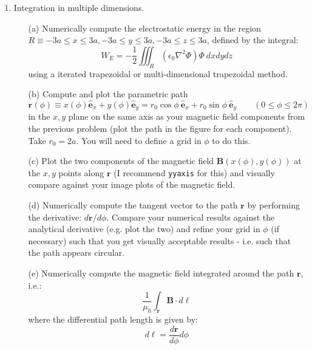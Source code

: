 \documentclass{article}
\begin{document}
\begin{enumerate}
\begin{itemize}
    
  \end{itemize}
  \item  Integration in multiple dimensions.  
  \begin{itemize}
    \item[(a)] Numerically compute the electrostatic energy in the region $R \equiv -3a \le x \le 3a, -3a \le y \le 3a, -3a \le z \le 3a$, defined by the integral:  
    \begin{equation}
      W_E = - \frac{1}{2} \iiint_R \left( \epsilon_0 \nabla^2 \Phi \right) \Phi ~dx dy dz
    \end{equation}
    using a iterated trapezoidal or multi-dimensional trapezoidal method.  
    \item[(b)]  Compute and plot the parametric path
    \begin{equation}
       \mathbf{r}(\phi) \equiv x(\phi)\hat{\mathbf{e}}_x + y(\phi)\hat{\mathbf{e}}_y = r_0 \cos \phi ~ \hat{\mathbf{e}}_x + r_0 \sin \phi ~ \hat{\mathbf{e}}_y \qquad (0 \le \phi \le 2 \pi)
    \end{equation}    
    in the $x,y$ plane on the same axis as your magnetic field components from the previous problem (plot the path in the figure for each component).  Take $r_0 = 2a$.  You will need to define a grid in $\phi$ to do this.
    \item[(c)]  Plot the two components of the magnetic field $\mathbf{B}(x(\phi),y(\phi))$ at the $x,y$ points along $\mathbf{r}$ (I recommend \texttt{yyaxis} for this) and visually compare against your image plots of the magnetic field.  
    \item[(d)]  Numerically compute the tangent vector to the path $\mathbf{r}$ by performing the derivative:  $d \mathbf{r} / d \phi$.  Compare your numerical results against the analytical derivative (e.g. plot the two) and refine your grid in $\phi$ (if necessary) such that you get visually acceptable results - i.e. such that the path appears circular.  
    \item[(e)]  Numerically compute the magnetic field integrated around the path $\mathbf{r}$, i.e.:
    \begin{equation}
       \frac{1}{\mu_0} \int_{\mathbf{r}} \mathbf{B} \cdot d \boldsymbol{\ell} 
    \end{equation}
    where the differential path length is given by:
    \begin{equation}
      d \boldsymbol{\ell} = \frac{d \mathbf{r}}{d \phi} d \phi 
    \end{equation}   
  \end{itemize}
\end{enumerate}
\end{document}
